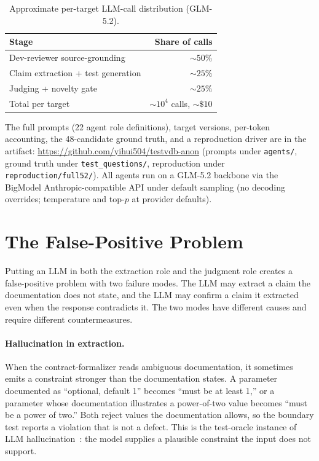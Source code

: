 \documentclass[sigconf]{acmart}
\begin{document}
\begin{table}[t]
\caption{Approximate per-target LLM-call distribution (GLM-5.2).}
\label{tab:cost}
\small
\begin{tabular}{@{}lr@{}}
\toprule
Stage & Share of calls \\
\midrule
Dev-reviewer source-grounding & ${\sim}50\%$ \\
Claim extraction + test generation & ${\sim}25\%$ \\
Judging + novelty gate & ${\sim}25\%$ \\
\midrule
Total per target & ${\sim}10^4$ calls, ${\sim}\$10$ \\
\bottomrule
\end{tabular}
\end{table} The full prompts (22 agent role definitions), target versions, per-token accounting, the 48-candidate ground truth, and a reproduction driver are in the artifact: \url{https://github.com/yihui504/testvdb-anon} (prompts under \texttt{agents/}, ground truth under \texttt{test\_questions/}, reproduction under \texttt{reproduction/full52/}). All agents run on a GLM-5.2 backbone via the BigModel Anthropic-compatible API under default sampling (no decoding overrides; temperature and top-$p$ at provider defaults).
\section{The False-Positive Problem}
\label{sec:fp}

Putting an LLM in both the extraction role and the judgment role creates a false-positive problem with two failure modes. The LLM may extract a claim the documentation does not state, and the LLM may confirm a claim it extracted even when the response contradicts it. The two modes have different causes and require different countermeasures.

\paragraph{Hallucination in extraction.}
When the contract-formalizer reads ambiguous documentation, it sometimes emits a constraint stronger than the documentation states. A parameter documented as ``optional, default 1'' becomes ``must be at least 1,'' or a parameter whose documentation illustrates a power-of-two value becomes ``must be a power of two.'' Both reject values the documentation allows, so the boundary test reports a violation that is not a defect. This is the test-oracle instance of LLM hallucination~\cite{ji23hall}: the model supplies a plausible constraint the input does not support.
\end{document}
